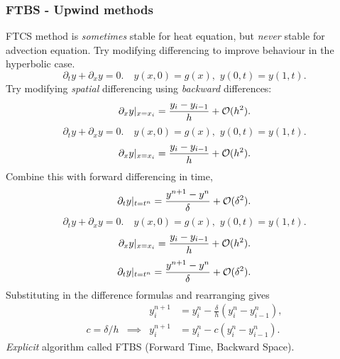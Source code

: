 \documentclass{beamer}
\begin{document}
\begin{frame}
  \frametitle{FTBS - Upwind methods}

  \begin{overlayarea}{\textwidth}{0.8\textheight}
    {
      FTCS method is \emph{sometimes} stable for
      heat equation, but \emph{never} stable for advection
      equation. Try modifying differencing to improve
      behaviour in the hyperbolic case.
    }
    {
      \begin{equation*}
        \partial_{t} y + \partial_{x} y = 0. \quad y(x, 0) = g(x),
        \,\, y(0, t) = y(1, t).
      \end{equation*}
      Try modifying \emph{spatial} differencing using \emph{backward}
      differences:
      \begin{equation*}
        \partial_{x} y |_{x = x_i} = \frac{y_{i} - y_{i-1}}{h} + {\cal
          O}(h^2).
      \end{equation*}
    }
    {
      \begin{equation*}
        \partial_{t} y + \partial_{x} y = 0. \quad y(x, 0) = g(x),
        \,\, y(0, t) = y(1, t).
      \end{equation*}
      \begin{equation*}
        \partial_{x} y |_{x = x_i} = \frac{y_{i} - y_{i-1}}{h} + {\cal
          O}(h^2).
      \end{equation*}
      Combine this with forward differencing in time,
      \begin{equation*}
        \partial_t y |_{t = t^n} = \frac{y^{n+1} - y^n}{\delta} + {\cal
          O}(\delta^2).
      \end{equation*}
    }
    {
      \begin{equation*}
        \partial_{t} y + \partial_{x} y = 0. \quad y(x, 0) = g(x),
        \,\, y(0, t) = y(1, t).
      \end{equation*}
      \begin{equation*}
        \partial_{x} y |_{x = x_i} = \frac{y_{i} - y_{i-1}}{h} + {\cal
          O}(h^2).
      \end{equation*}
      \begin{equation*}
        \partial_t y |_{t = t^n} = \frac{y^{n+1} - y^n}{\delta} + {\cal
          O}(\delta^2).
      \end{equation*}
      Substituting in the difference formulas and rearranging gives
      \begin{align*}
        && y_i^{n+1} & = y_i^n - \frac{\delta}{h} \left( y_{i}^n -
          y_{i-1}^n \right), \\
        c = \delta / h & \implies &
        y_i^{n+1} & = y_i^n - c \left( y_{i}^n - y_{i-1}^n \right).
      \end{align*}
    }
    {
      \emph{Explicit} algorithm called FTBS (Forward Time,
      Backward Space).
    }
  \end{overlayarea}

\end{frame}
\end{document}
